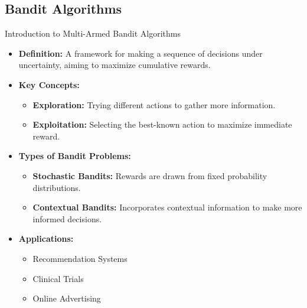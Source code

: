\documentclass{beamer}
\begin{document}
\subsection{Bandit Algorithms}
\begin{frame}{Introduction to Multi-Armed Bandit Algorithms}
    \begin{itemize}
        \item \textbf{Definition:} 
        A framework for making a sequence of decisions under uncertainty, aiming to maximize cumulative rewards.
        
        \item \textbf{Key Concepts:}
        \begin{itemize}
            \item \textbf{Exploration:} Trying different actions to gather more information.
            \item \textbf{Exploitation:} Selecting the best-known action to maximize immediate reward.
        \end{itemize}
        
        \item \textbf{Types of Bandit Problems:}
        \begin{itemize}
            \item \textbf{Stochastic Bandits:} Rewards are drawn from fixed probability distributions.
            \item \textbf{Contextual Bandits:} Incorporates contextual information to make more informed decisions.
        \end{itemize}
        
        \item \textbf{Applications:}
        \begin{itemize}
            \item Recommendation Systems
            \item Clinical Trials
            \item Online Advertising
        \end{itemize}
    \end{itemize}
\end{frame}
\end{document}
